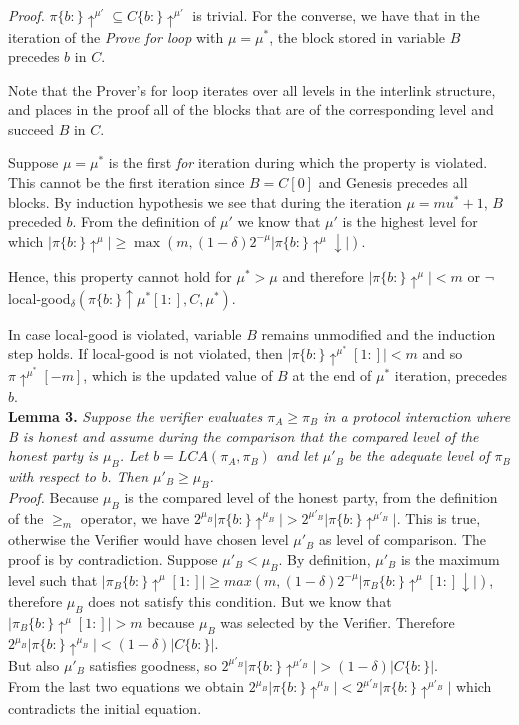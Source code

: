 \textit{Proof.} $ \pi\{b:\}\uparrow^{\mu'} \subseteq C\{b:\}\uparrow^{\mu'}$ is trivial. For the converse, we have that in the iteration of the \emph{Prove for loop}\cite{NIPoPoWs} with $\mu = \mu^*$, the block stored in variable $B$ precedes $b$ in $C$.

Note that the Prover's for loop iterates over all levels in the interlink structure, and places in the proof all of the blocks that are of the corresponding level and succeed $B$ in $C$. 

Suppose $\mu = \mu^*$ is the first \emph{for} iteration during which the property is violated. This cannot be the first iteration since $B = C[0]$ and Genesis precedes all blocks. By induction hypothesis we see that during the iteration $\mu = mu^* + 1$, $B$ preceded $b$. From the definition of $\mu'$ we know that $\mu'$ is the highest level for which $\vert \pi\{b:\}\uparrow^{\mu} \vert \geq \max( m, (1-\delta)2^{-\mu} \vert \pi\{b:\}\uparrow^{\mu}\downarrow \vert ) $. 

Hence, this property cannot hold for $\mu^* > \mu$ and therefore $\vert \pi\{b:\}\uparrow^{\mu} \vert < m$ or $\neg$local-good$_\delta(\pi\{b: \}\uparrow \mu^*[1:], C, \mu^*)$.

In case local-good is violated, variable $B$ remains unmodified and the induction step holds. If local-good is not violated, then $ \vert \pi\{b:\} \uparrow^{\mu^*}[1:] \vert < m$ and so $\pi\uparrow^{\mu^*}[-m]$, which is the updated value of $B$ at the end of $\mu^*$ iteration, precedes $b$.\\

\textbf{Lemma 3.} \textit{Suppose the verifier evaluates $\pi_A \geq \pi_B$ in a protocol interaction where B is honest and assume during the comparison that the compared level of the honest party is $\mu_B$. Let $b = LCA(\pi_A, \pi_B)$ and let ${\mu}'_B$ be the adequate level of $\pi_B$ with respect to b. Then ${\mu}'_B \geq \mu_B$.}\\

\textit{Proof.} Because $\mu_B$ is the compared level of the honest party, from the definition of the $\geq_m$ operator, we have $2^{\mu_B} \vert \pi\{b:\}\uparrow^{\mu_B} \vert > 2^{{\mu}'_B} \vert \pi\{b:\}\uparrow^{{\mu}'_B} \vert $. This is true, otherwise the Verifier would have chosen level $\mu'_B$ as level of comparison. The proof is by contradiction. Suppose $\mu'_B < \mu_B$. 
By definition, $\mu'_B$ is the maximum level such that $\vert \pi_B\{b:\}\uparrow^\mu [1:] \vert \geq max(m, (1-\delta)2^{-\mu}\vert \pi_B\{b:\}\uparrow^\mu [1:]\downarrow \vert)$, 
therefore $\mu_B$ does not satisfy this condition. 
But we know that $\vert \pi_B\{b:\}\uparrow^\mu [1:] \vert > m$ because $\mu_B$ was selected by the Verifier. 
Therefore $ 2^{\mu_B} \vert \pi\{b:\}\uparrow^{\mu_B} \vert < (1-\delta)\vert C\{b:\}\vert $. \\
But also $\mu'_B$ satisfies goodness, so $ 2^{\mu'_B} \vert \pi\{b:\}\uparrow^{\mu'_B} \vert > (1-\delta)\vert C\{b:\}\vert $.\\ From the last two equations we obtain $ 2^{\mu_B} \vert \pi\{b:\}\uparrow^{\mu_B} \vert < 2^{\mu'_B} \vert \pi\{b:\}\uparrow^{\mu'_B} \vert$ which contradicts the initial equation.\\

